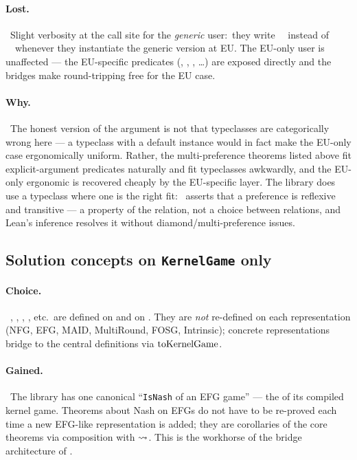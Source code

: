 \paragraph{Lost.}\ Slight verbosity at the call site for the
\emph{generic} user:\ they write ~\Profile\
instead of ~\Profile\ whenever they instantiate the
generic version at EU\@.  The EU-only user is unaffected — the
EU-specific predicates (, ,
, …) are exposed directly and the
 bridges make round-tripping free for the EU case.

\paragraph{Why.}\ The honest version of the argument is not that
typeclasses are categorically wrong here — a \TT{[Preference G]}
typeclass with a default \TT{euPref} instance would in fact make
the EU-only case ergonomically uniform.  Rather, the multi-preference
theorems listed above fit explicit-argument predicates naturally
and fit typeclasses awkwardly, and the EU-only ergonomic is
recovered cheaply by the EU-specific layer.  The library does
use a typeclass where one is the right fit:\  asserts that a preference is reflexive and transitive — a
property of the relation, not a choice between relations, and
Lean's inference resolves it without diamond/multi-preference
issues.

\subsection{Solution concepts on \texttt{KernelGame} only}
\label{sec:discussion:kg-only}

\paragraph{Choice.}\ , , ,
, etc.\ are defined on  and on
\TT{GameForm}.  They are \emph{not} re-defined on each
representation (NFG, EFG, MAID, MultiRound, FOSG, Intrinsic);
concrete representations bridge to the central definitions via
$\mathrm{toKernelGame}$.

\paragraph{Gained.}\ The library has one canonical
``\texttt{IsNash} of an EFG game'' — the  of its
compiled kernel game.  Theorems about Nash on EFGs do not have to
be re-proved each time a new EFG-like representation is added;
they are corollaries of the core theorems via composition with
$\rightsquigarrow$.  This is the workhorse of the bridge architecture
of .

